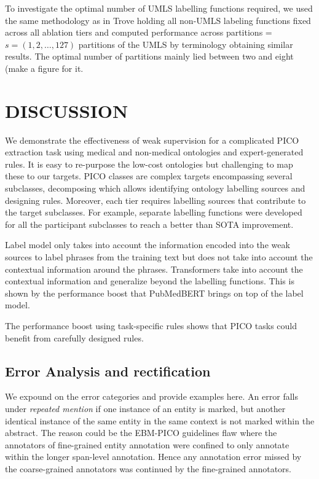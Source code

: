 \documentclass[10.7pt,]{article}
\begin{document}
To investigate the optimal number of UMLS labelling functions required, we used the same methodology as in Trove holding all non-UMLS labeling functions fixed across all ablation tiers and computed performance across partitions = $s = ( 1, 2, \dotso , 127 )$ partitions of the UMLS by terminology obtaining similar results.
The optimal number of partitions mainly lied between two and eight (make a figure for it.
%
%
%
\section{DISCUSSION}\label{discussion}
%
We demonstrate the effectiveness of weak supervision for a complicated PICO extraction task using medical and non-medical ontologies and expert-generated rules.
It is easy to re-purpose the low-cost ontologies but challenging to map these to our targets.
PICO classes are complex targets encompassing several subclasses, decomposing which allows identifying ontology labelling sources and designing rules. 
Moreover, each tier requires labelling sources that contribute to the target subclasses.
For example, separate labelling functions were developed for all the participant subclasses to reach a better than SOTA improvement.


Label model only takes into account the information encoded into the weak sources to label phrases from the training text but does not take into account the contextual information around the phrases.
Transformers take into account the contextual information and generalize beyond the labelling functions.
This is shown by the performance boost that PubMedBERT brings on top of the label model.

The performance boost using task-specific rules shows that PICO tasks could benefit from carefully designed rules.
%
%
%
\subsection{Error Analysis and rectification}\label{err_ana}
%
We expound on the error categories and provide examples here.
An error falls under \textit{repeated mention} if one instance of an entity is marked, but another identical instance of the same entity in the same context is not marked within the abstract. 
The reason could be the EBM-PICO guidelines flaw where the annotators of fine-grained entity annotation were confined to only annotate within the longer span-level annotation.
Hence any annotation error missed by the coarse-grained annotators was continued by the fine-grained annotators.
\end{document}
